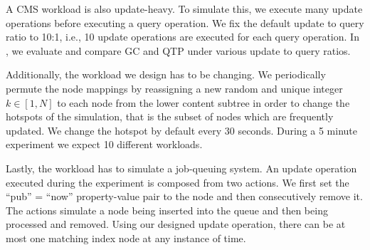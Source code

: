 \documentclass[abstracton,12pt]{scrartcl}
\theoremstyle{definition}
\begin{document}
A CMS workload is also update-heavy. To simulate this, we execute many update 
operations before
executing a query operation. We fix the default update to query ratio to 10:1, i.e., 
10 update operations are executed for each query operation. In
, we evaluate and compare GC and QTP under various
update to query ratios.

Additionally, the workload we design has to be changing. We periodically permute 
the node mappings by reassigning a new random and unique integer $k \in [1,N]$ to each
node from the lower content subtree in order to change the hotspots of the simulation,
that is the subset of nodes which are frequently updated.
We change the hotspot by default every 30 seconds. During a 5 minute
experiment we expect 10 different workloads.

Lastly, the workload has to simulate a job-queuing system. An update operation
executed during the experiment is composed from two actions. We first set the
``pub'' = ``now'' property-value pair to the node and then consecutively remove
it. The actions simulate a node being inserted into the queue and then being
processed and removed. Using our designed update operation, there can be at most
one matching index node at any instance of time.
\end{document}
